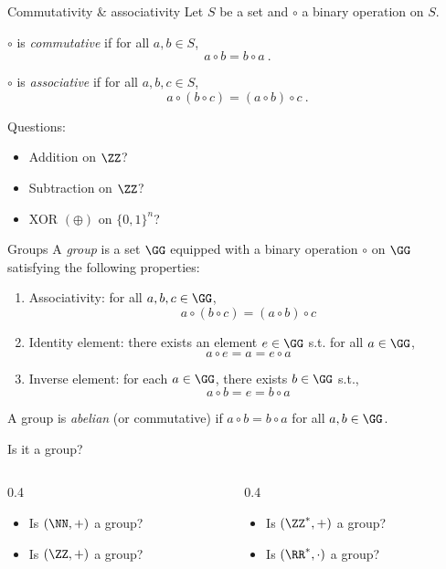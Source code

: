 \begin{frame}{Commutativity \& associativity}
  Let $S$ be a set and $\circ$ a binary operation on $S$.

  \pause
  $\circ$ is \emph{commutative} if for all $a, b\in S$,
  \[
      a \circ b = b \circ a\ .
  \]

  \pause
  $\circ$ is \emph{associative} if for all $a, b, c\in S$,
  \[
    a \circ (b \circ c) = (a \circ b) \circ c\ .
  \]

  \pause
  Questions:
  \begin{itemize}[<+(1)->]
    \item Addition on $\ZZ$?
    \item Subtraction on $\ZZ$?
    \item XOR $(\oplus)$ on $\{0,1\}^n$?
  \end{itemize}
\end{frame}

\begin{frame}{Groups}
  A \emph{group} is a set $\GG$ equipped with a binary operation $\circ$ on $\GG$ satisfying the following properties:
  \begin{enumerate}[<+(1)->]
    \item Associativity: for all $a, b, c\in \GG$,
    \[
      a \circ (b \circ c) = (a \circ b) \circ c
    \]
    \item Identity element: there exists an element $e\in \GG$ s.t. for all $a\in \GG$,
    \[
      a \circ e = a = e \circ a
    \]
    \item Inverse element: for each $a\in \GG$, there exists $b\in \GG$ s.t.,
    \[
      a \circ b = e = b \circ a
    \]
  \end{enumerate}
  \vspace*{-1em}
  \pause
  A group is \emph{abelian} (or commutative) if $a \circ b = b \circ a$ for all $a, b\in\GG$.
\end{frame}

\begin{frame}{Is it a group?}
  \begin{columns}[T]
    \begin{column}{0.4\textwidth}
        \begin{itemize}[<+(1)->]
        \item Is $(\NN, +)$ a group?
        \item Is $(\ZZ, +)$ a group?
      \end{itemize}
    \end{column}
    \begin{column}{0.4\textwidth}
      \begin{itemize}[<+(1)->]
        \item Is $(\ZZ^*, +)$ a group?
        \item Is $(\RR^*, \cdot)$ a group?
      \end{itemize}
    \end{column}
  \end{columns}
\end{frame}

